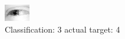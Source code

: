 \begin{figure}[h!]
\begin{center}
\includegraphics[width=0.60\columnwidth]{figures/ID2517_class_3_target_4.png}
\end{center}
\caption{ Classification: 3 actual target: 4}
\label{fig:ID2517_class_3_target_4}
\end{figure}
